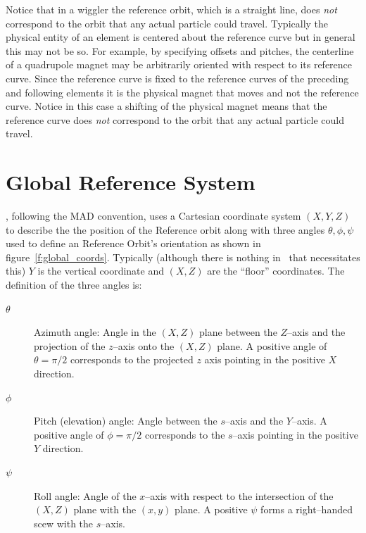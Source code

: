Notice that in a wiggler the reference orbit, which is a straight
line, does {\em not} correspond to the orbit that any actual particle
could travel. Typically the physical entity of an element is centered
about the reference curve but in general this may not be so. For
example, by specifying offsets and pitches, the centerline of a
quadrupole magnet may be arbitrarily oriented with respect to its
reference curve. Since the reference curve is fixed to the reference
curves of the preceding and following elements it is the physical
magnet that moves and not the reference curve. Notice in this case a
shifting of the physical magnet means that the reference curve does
{\em not} correspond to the orbit that any actual particle could
travel.


\section{Global Reference System}

\bmad, following the MAD convention, uses a Cartesian coordinate system
$(X, Y, Z)$ to describe the the position of the Reference orbit along
with three angles $\theta, \phi, \psi$ used to define an Reference
Orbit's orientation as shown in figure~\ref{f:global_coords}. Typically
(although there is nothing in \bmad\ that necessitates this) $Y$ is the
vertical coordinate and $(X, Z)$ are the ``floor'' coordinates. 
The definition of the three angles is:
\begin{description}
\item[$\theta$] Azimuth angle: Angle in the $(X, Z)$ plane 
between the $Z$--axis and the projection of the $z$--axis onto the
$(X, Z)$ plane. A positive angle of $\theta = \pi/2$ corresponds to the
projected $z$ axis pointing in the positive $X$ direction.
\item[$\phi$] Pitch (elevation) angle: Angle between the $s$--axis 
and the $Y$--axis. A positive angle of $\phi = \pi/2$ corresponds to
the $s$--axis pointing in the positive $Y$ direction.
\item[$\psi$] Roll angle: Angle of the $x$--axis with respect 
to the intersection of the $(X, Z)$ plane with the $(x, y)$ plane. A
positive $\psi$ forms a right--handed scew with the $s$--axis.
\end{description}

